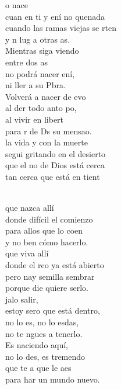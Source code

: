 \begin{cancion}%
	o nace  \\
	cuan en ti y ení no quenada\\
	cuando las ramas viejas se rten\\
	y n lug a otras as.\\
\jump
	Mientras siga viendo   \\
	entre dos as \\
	no podrá nacer ení,\\
	ni ller a  su Pbra. \\
\jump
	Volverá a nacer de evo\\
	al der todo anto po, \\
	al vivir en libert\\
	para r de Ds su mensao.\\
\jump
	 la vida y con la muerte\\
	segui gritando en el desierto  \\
	que el no de Dios está cerca\\
	tan cerca que está en tient\\\jump\\
	\begin{chorus}%
	 que nazca allí\\
	donde  difícil el comienzo\\
	para allos que lo coen\\
	y no ben cómo hacerlo.\\
\jump
	 que viva allí\\
	donde el rco ya está abierto\\
	pero nay semilla  sembrar\\
	porque die quiere serlo.\\
\jump
	jalo salir,\\
	estoy sero que está dentro,\\
	no lo es, no lo esdas,\\
	no te ngues a tenerlo.\\
\jump
	Es naciendo aquí,\\
	no lo des, es tremendo\\
	que te a que le aes\\
	para har un mundo nuevo.\\
	\end{chorus}%
	\jump\\
\end{cancion}%
